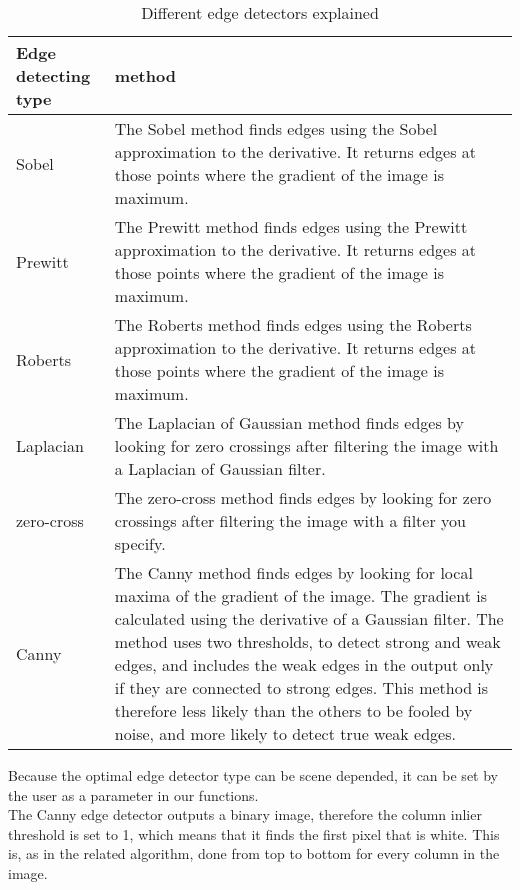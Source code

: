 \begin{table}[ht]
\caption{Different edge detectors explained}
\label{tab:edge}
\begin{tabular}{|l|p{10cm}|}
	\hline
	Edge detecting type		& method\\
	\hline
	\hline
	Sobel					& The Sobel method finds edges using the Sobel
	approximation to the derivative. It returns edges at those points where the
	gradient of the image is maximum.\\
	\hline
	Prewitt					& The Prewitt method finds edges using the Prewitt
	approximation to the derivative. It returns edges at those points where the
	gradient of the image is maximum.\\
	\hline
	Roberts					& The Roberts method finds edges using the Roberts
	approximation to the derivative. It returns edges at those points where the
	gradient of the image is maximum.\\
	\hline
	Laplacian				& The Laplacian of Gaussian method finds edges by
	looking for zero crossings after filtering the image with a Laplacian of Gaussian
	filter.\\
	\hline
	zero-cross				& The zero-cross method finds edges by looking for zero
	crossings after filtering the image with a filter you specify.\\
	\hline
	Canny					& The Canny method finds edges by looking for local
	maxima of the gradient of the image. The gradient is calculated using the derivative of
	a Gaussian filter. The method uses two thresholds, to detect strong and weak
	edges, and includes the weak edges in the output only if they are connected to
	strong edges. This method is therefore less likely than the others to be fooled
	by noise, and more likely to detect true weak edges.\\
	\hline
\end{tabular}
\end{table}

Because the optimal edge detector type can be scene depended, it can be set
by the user as a parameter in our functions.\\

The Canny edge detector outputs a binary image, therefore the column inlier
threshold is set to 1, which means that it finds the first pixel that is white. 
This is, as in the related algorithm, done from top to bottom for every column in
the image.\\

